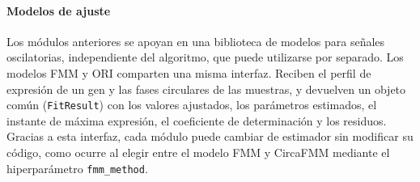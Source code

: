 \documentclass[12pt, a4paper]{report}
\begin{document}
\paragraph{Modelos de ajuste}
Los módulos anteriores se apoyan en una biblioteca de modelos para señales oscilatorias, independiente del algoritmo, que puede utilizarse por separado. Los modelos FMM y ORI comparten una misma interfaz. Reciben el perfil de expresión de un gen y las fases circulares de las muestras, y devuelven un objeto común (\texttt{FitResult}) con los valores ajustados, los parámetros estimados, el instante de máxima expresión, el coeficiente de determinación y los residuos. Gracias a esta interfaz, cada módulo puede cambiar de estimador sin modificar su código, como ocurre al elegir entre el modelo FMM y CircaFMM mediante el hiperparámetro \texttt{fmm\_method}.
\end{document}
